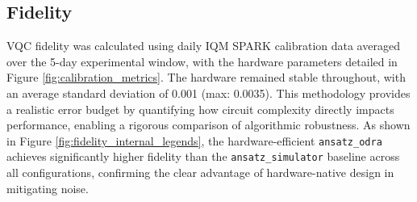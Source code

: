 \documentclass[11pt]{article}
\begin{document}
\subsection{Fidelity}
VQC fidelity was calculated using daily IQM SPARK calibration data averaged over the 5-day experimental window, with the hardware parameters detailed in Figure \ref{fig:calibration_metrics}. The hardware remained stable throughout, with an average standard deviation of 0.001 (max: 0.0035). This methodology provides a realistic error budget by quantifying how circuit complexity directly impacts performance, enabling a rigorous comparison of algorithmic robustness. As shown in Figure \ref{fig:fidelity_internal_legends}, the hardware-efficient \texttt{ansatz\_odra} achieves significantly higher fidelity than the \texttt{ansatz\_simulator} baseline across all configurations, confirming the clear advantage of hardware-native design in mitigating noise.
\end{document}
